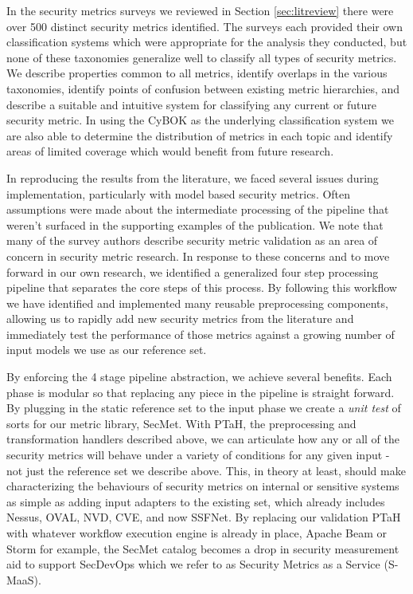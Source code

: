 % 


In the security metrics surveys we reviewed in Section \ref{sec:litreview} there were over 500 distinct security metrics identified. The surveys each provided their own classification systems which were appropriate for the analysis they conducted, but none of these taxonomies generalize well to classify all types of security metrics. We describe properties common to all metrics, identify overlaps in the various taxonomies, identify points of confusion between existing metric hierarchies, and describe a suitable and intuitive system for classifying any current or future security metric. In using the CyBOK as the underlying classification system we are also able to determine the distribution of metrics in each topic and identify areas of limited coverage which would benefit from future research. 

In reproducing the results from the literature, we faced several issues during implementation, particularly with model based security metrics. Often assumptions were made about the intermediate processing of the pipeline that weren't surfaced in the supporting examples of the publication. We note that many of the survey authors describe security metric validation as an area of concern in security metric research. In response to these concerns and to move forward in our own research, we identified a generalized four step processing pipeline that separates the core steps of this process. By following this workflow we have identified and implemented many reusable preprocessing components, allowing us to rapidly add new security metrics from the literature and immediately test the performance of those metrics against a growing number of input models we use as our reference set. 

By enforcing the 4 stage pipeline abstraction, we achieve several benefits. Each phase is modular so that replacing any piece in the pipeline is straight forward. By plugging in the static reference set to the input phase we create a \textit{unit test} of sorts for our metric library, SecMet. With PTaH, the preprocessing and transformation handlers described above, we can articulate how any or all of the security metrics will behave under a variety of conditions for any given input - not just the reference set we describe above. This, in theory at least, should make characterizing the behaviours of security metrics on internal or sensitive systems as simple as adding input adapters to the existing set, which already includes Nessus, OVAL, NVD, CVE, and now SSFNet. By replacing our validation PTaH with whatever workflow execution engine is already in place, Apache Beam or Storm for example, the SecMet catalog becomes a drop in security measurement aid to support SecDevOps which we refer to as Security Metrics as a Service (S-MaaS).

